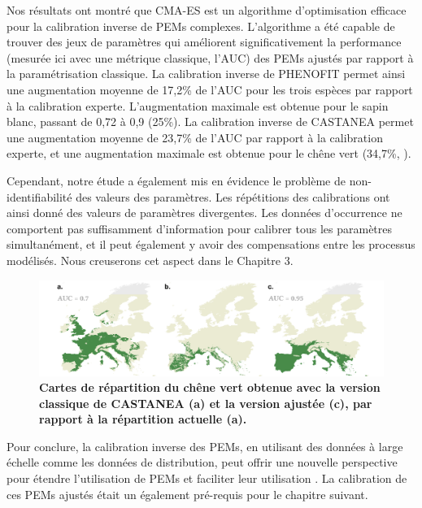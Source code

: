 Nos résultats ont montré que CMA-ES est un algorithme d'optimisation efficace pour la calibration inverse de PEMs complexes. L'algorithme a été capable de trouver des jeux de paramètres qui améliorent significativement la performance (mesurée ici avec une métrique classique, l'AUC) des PEMs ajustés par rapport à la paramétrisation classique.  
La calibration inverse de PHENOFIT permet ainsi une augmentation moyenne de 17,2\% de l'AUC pour les trois espèces par rapport à la calibration experte. L'augmentation maximale est obtenue pour le sapin blanc, passant de 0,72 à 0,9 (25\%). La calibration inverse de CASTANEA permet une augmentation moyenne de 23,7\% de l'AUC par rapport à la calibration experte, et une augmentation maximale est obtenue pour le chêne vert (34,7\%, ).

Cependant, notre étude a également mis en évidence le problème de non-identifiabilité des valeurs des paramètres. Les répétitions des calibrations ont ainsi donné des valeurs de paramètres divergentes. Les données d'occurrence ne comportent pas suffisamment d'information pour calibrer tous les paramètres simultanément, et il peut également y avoir des compensations entre les processus modélisés. Nous creuserons cet aspect dans le Chapitre 3.

\clearpage

\begin{figure}
\vspace*{-0cm}
\centering
\hspace*{-0.8cm}
\includegraphics[width = 21cm]{resume/figs/cmaes_FR.pdf}
\caption{\textbf{Cartes de répartition du chêne vert obtenue avec la version classique de CASTANEA \textbf{(a)} et la version ajustée \textbf{(c)}, par rapport à la répartition actuelle \textbf{(a)}.}}
\vspace*{-0cm}
\label{fig:R3}
\end{figure}

Pour conclure, la calibration inverse des PEMs, en utilisant des données à large échelle comme les données de distribution, peut offrir une nouvelle perspective pour étendre l'utilisation de PEMs et faciliter leur utilisation \citep{Higgins2020, Evans2016}. La calibration de ces PEMs ajustés était un également pré-requis pour le chapitre suivant.


